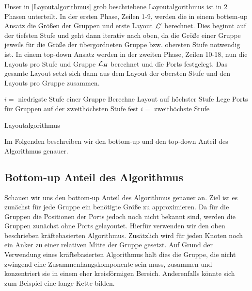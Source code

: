Unser in \autoref{Layoutalgorithmus} grob beschriebene Layoutalgorithmus ist in 2 Phasen unterteilt. 
In der ersten Phase, Zeilen 1-9, werden die in einem bottem-up Ansatz die Größen der Gruppen und erste Layout $\mathcal{L}'$ berechnet. 
Dies beginnt auf der tiefsten Stufe und geht dann iterativ nach oben, da die Größe einer Gruppe jeweils für die Größe der übergordneten Gruppe bzw. obersten Stufe notwendig ist.
In einem top-down Ansatz werden in der zweiten Phase, Zeilen 10-18, nun die Layouts pro Stufe und Gruppe $\mathcal{L}_H$ berechnet und die Ports festgelegt. Das gesamte Layout setzt 
sich dann aus dem Layout der obersten Stufe und den Layouts pro Gruppe zusammen.

\begin{algorithm}[H]
\label{Layoutalgorithmus}
\SetAlgoLined
{} %
$i =$ niedrigste Stufe einer Gruppe\;
Berechne Layout auf höchster Stufe\;
Lege Ports für Gruppen auf der zweithöchsten Stufe fest\;
$i =$ zweithöchste Stufe\; 
\caption{Layoutalgorithmus}
\end{algorithm}

Im Folgenden beschreiben wir den bottom-up und den top-down Anteil des Algorithmus genauer. 

\subsection{Bottom-up Anteil des Algorithmus}
Schauen wir uns den bottom-up Anteil des Algorithmus genauer an. Ziel ist es zunächst für jede Gruppe ein benötigte Größe zu approximieren.
Da für die Gruppen die Positionen der Ports jedoch noch nicht bekannt sind, werden die Gruppen zunächst ohne Ports gelayoutet.
Hierfür verwenden wir den oben beschrieben kräftebasierten Algorithmus. 
Zusätzlich wird  für jeden Knoten noch ein Anker zu einer relativen Mitte der Gruppe gesetzt. 
Auf Grund der Verwendung eines kräftebasierten Algorithmus hält dies die Gruppe, die nicht zwingend eine Zusammenhangskomponente sein muss, zusammen 
und konzentriert sie in einem eher kreisförmigen Bereich. Anderenfalls könnte sich zum Beispiel eine lange Kette bilden.

